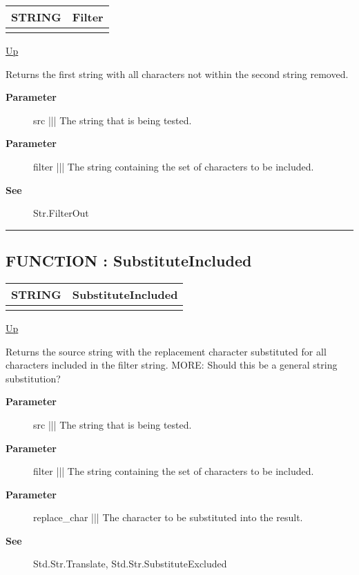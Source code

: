 {\renewcommand{\arraystretch}{1.5}
\begin{tabularx}{\textwidth}{|>{\raggedright\arraybackslash}l|X|}
\hline
\hspace{0pt}STRING & Filter \\
\hline
\multicolumn{2}{|>{\raggedright\arraybackslash}X|}{\hspace{0pt}(STRING src, STRING filter)} \\
\hline
\end{tabularx}
}

\hyperlink{ecldoc:Str}{Up}

\par
Returns the first string with all characters not within the second string removed.

\par
\begin{description}
\item [\textbf{Parameter}] src ||| The string that is being tested.
\item [\textbf{Parameter}] filter ||| The string containing the set of characters to be included.
\item [\textbf{See}] Str.FilterOut
\end{description}

\rule{\textwidth}{0.4pt}
\subsection*{FUNCTION : SubstituteIncluded}
\hypertarget{ecldoc:str.substituteincluded}{}

{\renewcommand{\arraystretch}{1.5}
\begin{tabularx}{\textwidth}{|>{\raggedright\arraybackslash}l|X|}
\hline
\hspace{0pt}STRING & SubstituteIncluded \\
\hline
\multicolumn{2}{|>{\raggedright\arraybackslash}X|}{\hspace{0pt}(STRING src, STRING filter, STRING1 replace\_char)} \\
\hline
\end{tabularx}
}

\hyperlink{ecldoc:Str}{Up}

\par
Returns the source string with the replacement character substituted for all characters included in the filter string. MORE: Should this be a general string substitution?

\par
\begin{description}
\item [\textbf{Parameter}] src ||| The string that is being tested.
\item [\textbf{Parameter}] filter ||| The string containing the set of characters to be included.
\item [\textbf{Parameter}] replace\_char ||| The character to be substituted into the result.
\item [\textbf{See}] Std.Str.Translate, Std.Str.SubstituteExcluded
\end{description}

